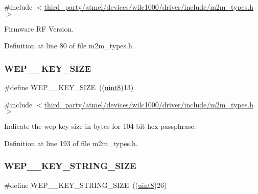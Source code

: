 {\ttfamily \#include $<$\hyperlink{m2m__types_8h}{third\+\_\+party/atmel/devices/wilc1000/driver/include/m2m\+\_\+types.\+h}$>$}

Firmware RF Version. 

Definition at line 80 of file m2m\+\_\+types.\+h.

\mbox{\label{group__WlanDefines_gadbe04fcea97e8fbab9b38d8649049c47}} 
\subsubsection{\texorpdfstring{W\+E\+P\+\_\+\_\+\+K\+E\+Y\+\_\+\+S\+I\+ZE}{WEP\_104\_KEY\_SIZE}}
{\footnotesize\ttfamily \#define W\+E\+P\+\_\+\_\+\+K\+E\+Y\+\_\+\+S\+I\+ZE~((\hyperlink{group__DataT_ga4df709a77647e870bbf1d955b8edc9a6}{uint8})13)}



{\ttfamily \#include $<$\hyperlink{m2m__types_8h}{third\+\_\+party/atmel/devices/wilc1000/driver/include/m2m\+\_\+types.\+h}$>$}

Indicate the wep key size in bytes for 104 bit hex passphrase. 

Definition at line 193 of file m2m\+\_\+types.\+h.

\mbox{\label{group__WlanDefines_ga087f8be759b11ec0fe841d21e60367f5}} 
\subsubsection{\texorpdfstring{W\+E\+P\+\_\+\_\+\+K\+E\+Y\+\_\+\+S\+T\+R\+I\+N\+G\+\_\+\+S\+I\+ZE}{WEP\_104\_KEY\_STRING\_SIZE}}
{\footnotesize\ttfamily \#define W\+E\+P\+\_\+\_\+\+K\+E\+Y\+\_\+\+S\+T\+R\+I\+N\+G\+\_\+\+S\+I\+ZE~((\hyperlink{group__DataT_ga4df709a77647e870bbf1d955b8edc9a6}{uint8})26)}



